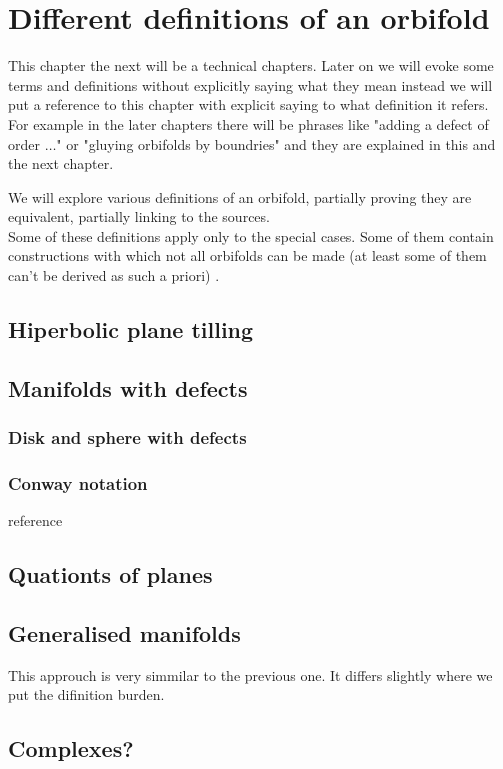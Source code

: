 \chapter{Different definitions of an orbifold}

This chapter the next will be a technical chapters. Later on we will evoke some terms and 
definitions without 
explicitly saying what they mean instead we will put a reference to this chapter with explicit 
saying to what definition it refers. \\
For example in the later chapters there will be phrases like "adding a defect of order $\dots$" or 
"gluying orbifolds by boundries" and they are explained in this and the next chapter.
 

We will explore various definitions of an orbifold, partially proving they are equivalent, partially 
linking to the sources. \\
Some of these definitions apply only to the special cases. Some of them contain constructions 
with which not all orbifolds can be made (at least some of them can't be derived as such a priori)
. \\

\section{Hiperbolic plane tilling}

\section{Manifolds with defects}
\subsection{Disk and sphere with defects}



\subsection{Conway notation}
reference 

\section{Quationts of planes}

\section{Generalised manifolds}
This approuch is very simmilar to the previous one. It differs slightly where we put the 
difinition burden. 

\section{Complexes?}

